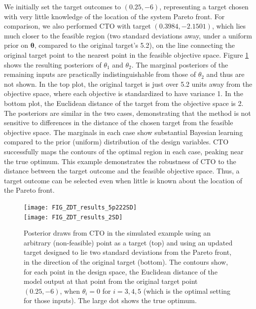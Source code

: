 \documentclass[twocolumn,10pt]{asme2ej}
\begin{document}
We initially set the target outcomes to $(0.25, -6)$, representing a target chosen with very little knowledge of the location of the system Pareto front. 
%
%
For comparison, we also performed CTO with target $(0.3984, -2.1501)$, which lies much closer  to the feasible region (two standard deviations away, under a uniform prior on $\boldsymbol\theta$, compared to the original target's 5.2), on the line connecting the original target point to the nearest point in the feasible objective space.
%
%
Figure \ref{fig:toy_sim_results} shows the resulting posteriors of $\theta_1$ and $\theta_2$. %
%
The marginal posteriors of the remaining inputs are practically  indistinguishable from those of $\theta_2$ and thus are not shown.
%
In the top plot, the original target is just over 5.2 units away from the objective space, where each objective is standardized to have variance 1.
%
In the bottom plot, the Euclidean distance of the target from the objective space is 2.
%
The posteriors are similar in the two cases, demonstrating that the method is not sensitive to differences in the distance of the chosen target from the feasible objective space.
%
The marginals in each case show substantial Bayesian learning compared to the prior (uniform) distribution of the design variables. 
%
CTO successfully maps the contours of the optimal region in each case, peaking near the true optimum. 
%
%
This example demonstrates the robustness of CTO to the distance between the target outcome and the feasible objective space.
%
Thus, a target outcome can be selected even when little is known about the location of the Pareto front.

%
\begin{figure}
	\centering
	\texttt{[image: FIG\_ZDT\_results\_5p222SD]}\\
	\vspace{1em}
	\texttt{[image: FIG\_ZDT\_results\_2SD]}
	\caption{Posterior draws from CTO in the simulated example using an arbitrary (non-feasible) point as a target (top) and using an updated target designed to lie two standard deviations from the Pareto front, in the direction of the original target (bottom). The contours show, for each point in the design space, the Euclidean distance of the model output at that point from the original target point $(0.25,-6)$, when $\theta_i=0$ for $i=3,4,5$ (which is the optimal setting for those inputs). The large dot shows the true optimum.}
	\label{fig:toy_sim_results}
\end{figure}
\end{document}
